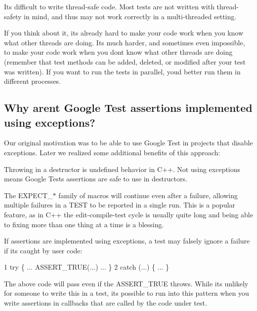 It\textquotesingle{}s difficult to write thread-\/safe code. Most tests are not written with thread-\/safety in mind, and thus may not work correctly in a multi-\/threaded setting.

If you think about it, it\textquotesingle{}s already hard to make your code work when you know what other threads are doing. It\textquotesingle{}s much harder, and sometimes even impossible, to make your code work when you don\textquotesingle{}t know what other threads are doing (remember that test methods can be added, deleted, or modified after your test was written). If you want to run the tests in parallel, you\textquotesingle{}d better run them in different processes.

\subsection*{Why aren\textquotesingle{}t Google Test assertions implemented using exceptions?}

Our original motivation was to be able to use Google Test in projects that disable exceptions. Later we realized some additional benefits of this approach\+:


\begin{DoxyEnumerate}
\item Throwing in a destructor is undefined behavior in C++. Not using exceptions means Google Test\textquotesingle{}s assertions are safe to use in destructors.
\end{DoxyEnumerate}
\begin{DoxyEnumerate}
\item The {\ttfamily E\+X\+P\+E\+C\+T\+\_\+$\ast$} family of macros will continue even after a failure, allowing multiple failures in a {\ttfamily T\+E\+ST} to be reported in a single run. This is a popular feature, as in C++ the edit-\/compile-\/test cycle is usually quite long and being able to fixing more than one thing at a time is a blessing.
\end{DoxyEnumerate}
\begin{DoxyEnumerate}
\item If assertions are implemented using exceptions, a test may falsely ignore a failure if it\textquotesingle{}s caught by user code\+: 
\begin{DoxyCode}
1 try \{ ... ASSERT\_TRUE(...) ... \}
2 catch (...) \{ ... \}
\end{DoxyCode}
 The above code will pass even if the {\ttfamily A\+S\+S\+E\+R\+T\+\_\+\+T\+R\+UE} throws. While it\textquotesingle{}s unlikely for someone to write this in a test, it\textquotesingle{}s possible to run into this pattern when you write assertions in callbacks that are called by the code under test.
\end{DoxyEnumerate}

